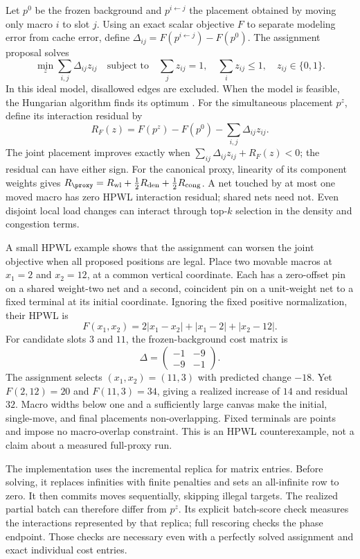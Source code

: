 Let $p^0$ be the frozen background and $p^{i\leftarrow j}$ the placement obtained
by moving only macro $i$ to slot $j$. Using an exact scalar objective $F$ to
separate modeling error from cache error, define
$\Delta_{ij}=F(p^{i\leftarrow j})-F(p^0)$. The assignment proposal solves
\begin{equation}
 \min_z\sum_{i,j}\Delta_{ij}z_{ij}
 \quad\text{subject to}\quad
 \sum_jz_{ij}=1,\quad\sum_iz_{ij}\le1,\quad z_{ij}\in\{0,1\}.
 \label{eq:assignment-model}
\end{equation}
In this ideal model, disallowed edges are excluded. When the model is feasible,
the Hungarian algorithm finds its optimum \citep{kuhn1955hungarian}.
For the simultaneous placement $p^z$,
define its interaction residual by
\begin{equation}
 R_F(z)=F(p^z)-F(p^0)-\sum_{i,j}\Delta_{ij}z_{ij}.
 \label{eq:assignment-residual}
\end{equation}
The joint placement improves exactly when
$\sum_{ij}\Delta_{ij}z_{ij}+R_F(z)<0$; the residual can have either sign.
For the canonical proxy, linearity of its component weights gives
$R_{\proxy}=R_{\rm wl}+\tfrac12R_{\rm den}+\tfrac12R_{\rm cong}$.
A net touched by at most one moved macro has zero HPWL interaction residual;
shared nets need not. Even disjoint local load changes can interact through
top-$k$ selection in the density and congestion terms.

A small HPWL example shows that the assignment can worsen the joint objective
when all proposed positions are legal. Place two movable macros at
$x_1=2$ and $x_2=12$, at a common vertical coordinate. Each has a zero-offset
pin on a shared weight-two net and a second, coincident pin on a unit-weight
net to a fixed terminal at its initial coordinate. Ignoring the fixed positive
normalization, their HPWL is
\begin{equation}
 F(x_1,x_2)=2|x_1-x_2|+|x_1-2|+|x_2-12|.
 \label{eq:assignment-example}
\end{equation}
For candidate slots $3$ and $11$, the frozen-background cost matrix is
\begin{equation}
 \Delta=\begin{pmatrix}-1&-9\\-9&-1\end{pmatrix}.
\end{equation}
The assignment selects $(x_1,x_2)=(11,3)$ with predicted change $-18$.
Yet $F(2,12)=20$ and $F(11,3)=34$, giving a realized increase of $14$ and
residual $32$. Macro widths below one and a sufficiently large canvas make the
initial, single-move, and final placements non-overlapping. Fixed terminals are
points and impose no macro-overlap constraint. This is an HPWL counterexample,
not a claim about a measured full-proxy run.

The implementation uses the incremental replica for matrix entries. Before
solving, it replaces infinities with finite penalties and sets an all-infinite
row to zero. It then commits moves sequentially, skipping illegal targets.
The realized partial batch can
therefore differ from $p^z$. Its explicit batch-score check measures the
interactions represented by that replica; full rescoring checks the phase
endpoint. Those checks are necessary even with a perfectly solved assignment
and exact individual cost entries.
